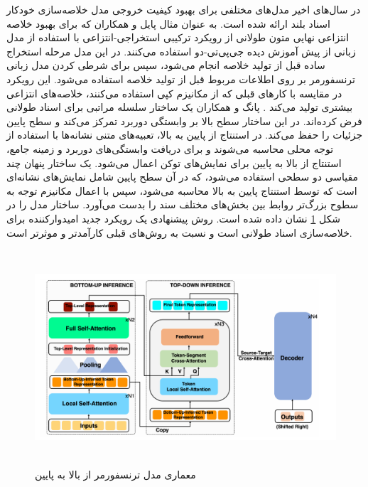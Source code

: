 
در سال‌های اخیر مدل‌های مختلفی برای بهبود کیفیت خروجی مدل خلاصه‌سازی خودکار اسناد بلند ارائه شده است. به عنوان مثال پایل
و همکاران که برای بهبود خلاصه انتزاعی نهایی متون طولانی از رویکرد ترکیبی استخراجی-انتزاعی با استفاده از مدل زبانی از پیش آموزش دیده جی‌پی‌تی-دو
استفاده می‌کنند. در این مدل مرحله استخراج ساده قبل از تولید خلاصه انجام می‌شود، سپس برای شرطی کردن مدل زبانی ترنسفورمر بر روی اطلاعات مربوط قبل از تولید خلاصه استفاده می‌شود. این رویکرد در مقایسه با کارهای قبلی که از مکانیزم کپی استفاده می‌کنند، خلاصه‌های انتزاعی بیشتری تولید می‌کند
\cite{pilault2020extractive}. 
پانگ
و همکاران یک ساختار سلسله مراتبی برای اسناد طولانی فرض کرده‌اند. در این ساختار سطح بالا بر وابستگی دوربرد تمرکز می‌کند و سطح پایین جزئیات را حفظ می‌کند. 
در استنتاج از پایین به بالا، تعبیه‌های متنی نشانه‌ها با استفاده از توجه محلی محاسبه می‌شوند و برای دریافت وابستگی‌های دوربرد و زمینه جامع، استنتاج از بالا به پایین برای نمایش‌های توکن اعمال می‌شود. یک ساختار پنهان چند مقیاسی دو سطحی استفاده می‌شود، که در آن سطح پایین شامل نمایش‌های نشانه‌ای است که توسط استنتاج پایین به بالا محاسبه می‌شود، سپس با اعمال مکانیزم توجه به سطوح بزرگ‌تر روابط بین بخش‌های مختلف سند را بدست می‌آورد. ساختار مدل را در شکل \ref{fig:top_down} نشان داده شده است. روش پیشنهادی یک رویکرد جدید امیدوارکننده برای خلاصه‌سازی اسناد طولانی است و نسبت به روش‌های قبلی کارآمدتر و موثرتر است\cite{pang2023long}.

\begin{figure}[!h]
	\begin{center}
		\includegraphics[height=8cm]{top_down.png}
	\end{center}
	\caption{ معماری مدل ترنسفورمر از بالا به پایین\cite{pang2023long}}
	\label{fig:top_down}
	\medskip
	
\end{figure}


